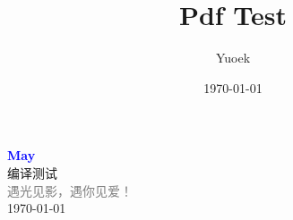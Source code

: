 \documentclass[UTF8, a4paper, 12pt]{ctexart}
\title{\Large Pdf Test}
\author{Yuoek}
\date{\today}
\begin{document}
\thispagestyle{empty}
\maketitle
\clearpage

\tableofcontents
\clearpage

\thispagestyle{empty}
\vspace*{\fill}
\begin{center}
    \textcolor{blue}{\Huge\textbf{May}} \\[1em]
    \textcolor{blue!60!black}{\Large 编译测试} \\[2em]
    \textcolor{gray}{\large 遇光见影，遇你见爱！} \\[1em]
    \today
\end{center}
\vspace*{\fill}
\clearpage



\clearpage
\end{document}
